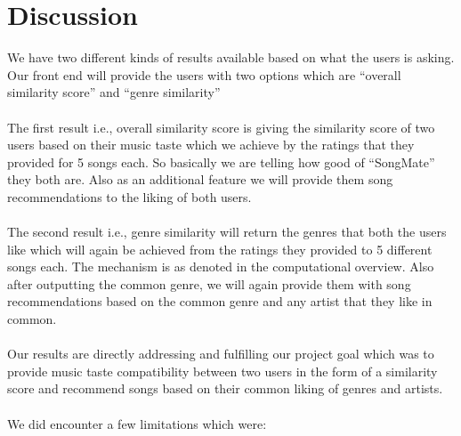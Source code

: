 \documentclass[fontsize=11pt]{article}
\begin{document}
\section*{Discussion}

We have two different kinds of results available based on what the users is asking. Our front end will provide the users with two options which are “overall similarity score” and “genre similarity”
\\\\
The first result i.e., overall similarity score is giving the similarity score of two users based on their music taste which we achieve by the ratings that they provided for 5 songs each. So basically we are telling how good of “SongMate” they both are. Also as an additional feature we will provide them song recommendations to the liking of both users.
\\\\
The second result i.e., genre similarity will return the genres that both the users like which will again be achieved from the ratings they provided to 5 different songs each. The mechanism is as denoted in the computational overview. Also after outputting the common genre, we will again provide them with song recommendations based on the common genre and any artist that they like in common. 
\\\\
Our results are directly addressing and fulfilling our project goal which was to provide music taste compatibility between two users in the form of a similarity score and recommend songs based on their common liking of genres and artists.
\\\\
We did encounter a few limitations which were:
\end{document}
